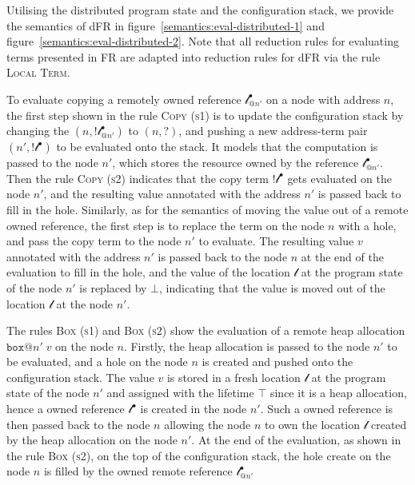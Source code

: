 Utilising the distributed program state and the configuration stack, we provide the semantics of dFR in figure~\ref{semantics:eval-distributed-1} and figure~\ref{semantics:eval-distributed-2}. Note that all reduction rules for evaluating terms presented in FR are adapted into reduction rules for dFR via the rule \textsc{Local Term}. 

To evaluate copying a remotely owned reference $\mathscr{l}^\bullet_{@n'}$ on a node with address $n$, the first step shown in the rule \textsc{Copy (s1)} is to update the configuration stack by changing the $(n, !\mathscr{l}^\bullet_{@n'})$ to $(n, ?)$, and pushing a new address-term pair $(n', !\mathscr{l}^\bullet)$ to be evaluated onto the stack. It models that the computation is passed to the node $n'$, which stores the resource owned by the reference $\mathscr{l}^\bullet_{@n'}$. Then the rule \textsc{Copy (s2)} indicates that the copy term $!\mathscr{l}^\bullet$ gets evaluated on the node $n'$, and the resulting value annotated with the address $n'$ is passed back to fill in the hole. Similarly, as for the semantics of moving the value out of a remote owned reference, the first step is to replace the term on the node $n$ with a hole, and pass the copy term to the node $n'$ to evaluate. The resulting value $v$ annotated with the address $n'$ is passed back to the node $n$ at the end of the evaluation to fill in the hole, and the value of the location $\mathscr{l}$ at the program state of the node $n'$ is replaced by $\bot$, indicating that the value is moved out of the location $\mathscr{l}$ at the node $n'$.

The rules \textsc{Box (s1)} and \textsc{Box (s2)} show the evaluation of a remote heap allocation $\texttt{box}@n'\;v$ on the node $n$. Firstly, the heap allocation is passed to the node $n'$ to be evaluated, and a hole on the node $n$ is created and pushed onto the configuration stack. The value $v$ is stored in a fresh location $\mathscr{l}$ at the program state of the node $n'$ and assigned with the lifetime $\top$ since it is a heap allocation, hence a owned reference $\mathscr{l}^\bullet$ is created in the node $n'$. Such a owned reference is then passed back to the node $n$ allowing the node $n$ to own the location $\mathscr{l}$ created by the heap allocation on the node $n'$. At the end of the evaluation, as shown in the rule \textsc{Box (s2)}, on the top of the configuration stack, the hole create on the node $n$ is filled by the owned remote reference $\mathscr{l}^\bullet_{@n'}$

